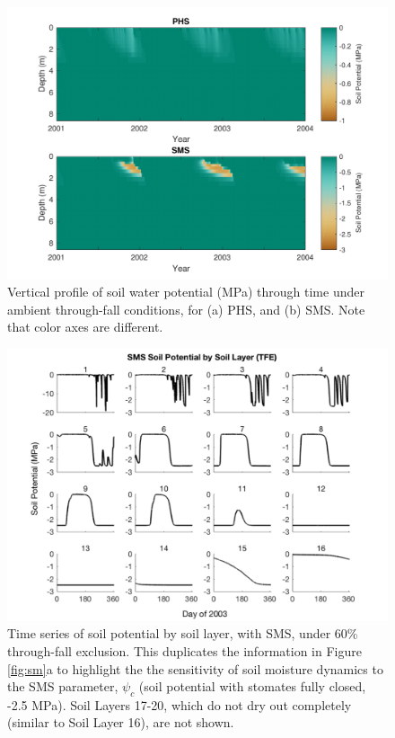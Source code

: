 \documentclass[draft,linenumbers]{agujournal}
\begin{document}
  
        \clearpage
    \begin{figure}[h]
     \centering
     \includegraphics[width=30pc]{../figs2/suppsmp.pdf}
     \caption{Vertical profile of soil water potential (MPa) through time under ambient through-fall conditions, for
     (a) PHS, and 
     (b) SMS.
     Note that color axes are different. }
     \label{supp:sm}
  \end{figure}
  

    \begin{figure}[h]
     \centering
     \includegraphics[width=30pc]{../figs2/supp_smlayer.pdf}
     \caption{Time series of soil potential by soil layer, with SMS, under 60\% through-fall exclusion. 
     This duplicates the information in Figure \ref{fig:sm}a to highlight the the sensitivity of soil moisture dynamics to the SMS parameter, $\psi_c$ (soil potential with stomates fully closed, -2.5 MPa).
     Soil Layers 17-20, which do not dry out completely (similar to Soil Layer 16), are not shown.}
     \label{supp:sm2}
  \end{figure}
          \clearpage
\end{document}
